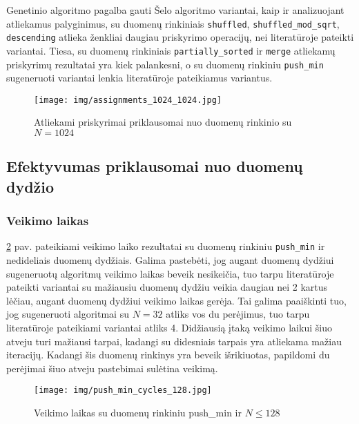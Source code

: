 \documentclass{VUMIFInfBakalaurinis}
\begin{document}
Genetinio algoritmo pagalba gauti Šelo algoritmo variantai, kaip ir analizuojant atliekamus palyginimus,
su duomenų rinkiniais \verb|shuffled|, \verb|shuffled_mod_sqrt|, \verb|descending| atlieka ženkliai daugiau priskyrimo operacijų, nei literatūroje pateikti variantai.
Tiesa, su duomenų rinkiniais \verb|partially_sorted| ir \verb|merge| atliekamų priskyrimų rezultatai yra kiek palankesni,
o su duomenų rinkiniu \verb|push_min|
sugeneruoti variantai lenkia literatūroje pateikiamus variantus.


\begin{figure}[H]
  \centering
  \texttt{[image: img/assignments\_1024\_1024.jpg]}
  \caption{Atliekami priskyrimai priklausomai nuo duomenų rinkinio su $N = 1024$}
  \label{img:assignments_1024_1024}
\end{figure}

\pagebreak

\subsection{Efektyvumas priklausomai nuo duomenų dydžio}

\subsubsection{Veikimo laikas}

\ref{img:push_min_cycles_128} pav. pateikiami veikimo laiko rezultatai su duomenų rinkiniu \verb|push_min| ir nedideliais duomenų dydžiais.
Galima pastebėti, jog augant duomenų dydžiui sugeneruotų algoritmų veikimo laikas beveik nesikeičia, tuo tarpu literatūroje pateikti variantai
su mažiausiu duomenų dydžiu veikia daugiau nei 2 kartus lėčiau, augant duomenų dydžiui veikimo laikas gerėja.
Tai galima paaiškinti tuo, jog sugeneruoti algoritmai su $N = 32$ atliks vos du perėjimus, tuo tarpu literatūroje pateikiami variantai atliks 4.
Didžiausią įtaką veikimo laikui šiuo atveju turi mažiausi tarpai, kadangi su didesniais tarpais yra atliekama mažiau iteracijų.
Kadangi šis duomenų rinkinys yra beveik išrikiuotas, papildomi du perėjimai šiuo atveju pastebimai sulėtina veikimą.

\begin{figure}[H]
  \centering
  \texttt{[image: img/push\_min\_cycles\_128.jpg]}
  \caption{Veikimo laikas su duomenų rinkiniu push\_min ir $N \leq 128$}
  \label{img:push_min_cycles_128}
\end{figure}
\end{document}

